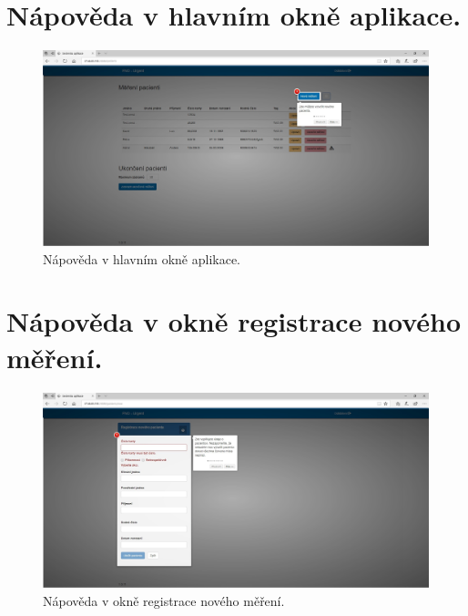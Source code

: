 \documentclass[czech,master,public,dept450,male,oneside, hidelinks]{diploma}
\begin{document}
	\section{Nápověda v hlavním okně aplikace.}
	\begin{figure}[H]
		\centering
		\includegraphics[width=16cm]{Appendix/src/Help1Screen.jpg}
		\caption{Nápověda v hlavním okně aplikace.}
	\end{figure}
		
	\section{Nápověda v okně registrace nového měření.}
	\begin{figure}[H]
		\centering
		\includegraphics[width=16cm]{Appendix/src/Help2Screen.jpg}
		\caption{Nápověda v okně registrace nového měření.}
	\end{figure}
\end{document}
